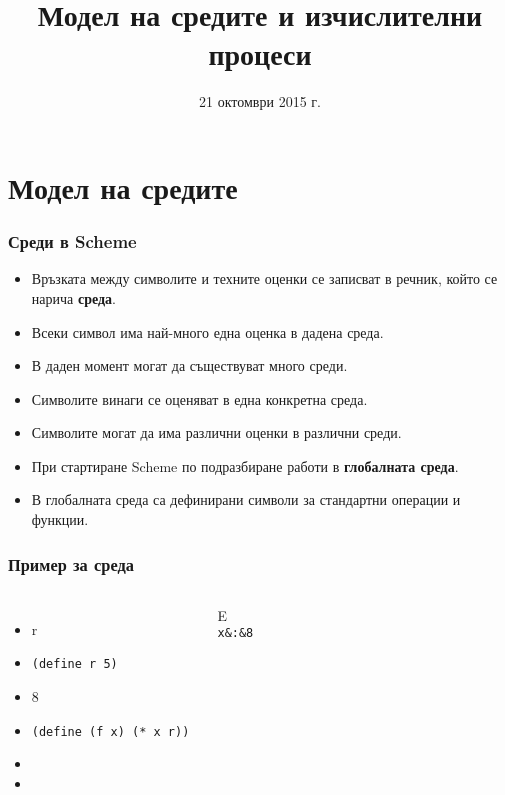 \documentclass{beamer}
\title[Среди и процеси]{Модел на средите и изчислителни процеси}
\date{21 октомври 2015 г.}
\begin{document}
\begin{frame}
  \titlepage
\end{frame}

\section{Модел на средите}

\begin{frame}
  \frametitle{Среди в Scheme}

  \begin{itemize}[<+->]
  \item Връзката между символите и техните оценки се записват в речник, който се нарича \textbf{среда}.
  \item Всеки символ има най-много една оценка в дадена среда.
  \item В даден момент могат да съществуват много среди.
  \item Символите винаги се оценяват в една конкретна среда.
  \item \alert{Символите могат да има различни оценки в различни среди.}
  \item При стартиране Scheme по подразбиране работи в \textbf{глобалната среда}.
  \item В глобалната среда са дефинирани символи за стандартни операции и функции.
  \end{itemize}
\end{frame}

\begin{frame}
  \frametitle{Пример за среда}

  \begin{columns}[t,onlytextwidth]
    {}

    \begin{itemize}[<+->]
    \item \evalstoerr r
    \item \tt{(define r 5)}
    \item {}8
    \item \tt{(define (f x) (* x r))}
    \item {}
    \item {}
    \end{itemize}

    {}

    \begin{envir}{E}
      \\\firstinenv \tt x&:&8
    \end{envir}
  \end{columns}
\end{frame}
\end{document}
